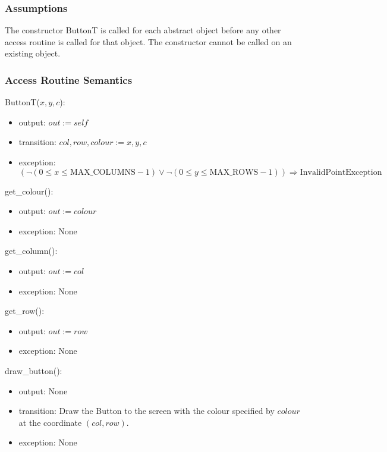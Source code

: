 \documentclass[12pt]{article}
\begin{document}
\subsubsection* {Assumptions}
The constructor ButtonT is called for each abstract object before any other access routine
is called for that object. The constructor cannot be called on an existing object.

\subsubsection* {Access Routine Semantics}

ButtonT($x,y,c$): 
\begin{itemize} 
\item output: $\mathit{out} := \mathit{self} $
\item transition: $col, row, colour := x, y, c$
\item exception: $(\lnot(0\leq x\leq \text{MAX\_COLUMNS}-1) \lor \lnot(0\leq y\leq \text{MAX\_ROWS}-1)) \Rightarrow \text{InvalidPointException}$
\end{itemize}

\noindent get\_colour(): 
\begin{itemize} 
\item output: $\mathit{out} := colour$
\item exception: None
\end{itemize}

\noindent get\_column(): 
\begin{itemize}
\item output: $\mathit{out} := col $
\item exception: None
\end{itemize}

\noindent get\_row(): 
\begin{itemize} 
\item output: $\mathit{out} := row $
\item exception: None
\end{itemize}

\noindent draw\_button(): 
\begin{itemize} 

\item output: None
\item transition: Draw the Button to the screen with the colour specified by $colour$ at the coordinate $(col,row)$.
\item exception: None
\end{itemize}
\end{document}
